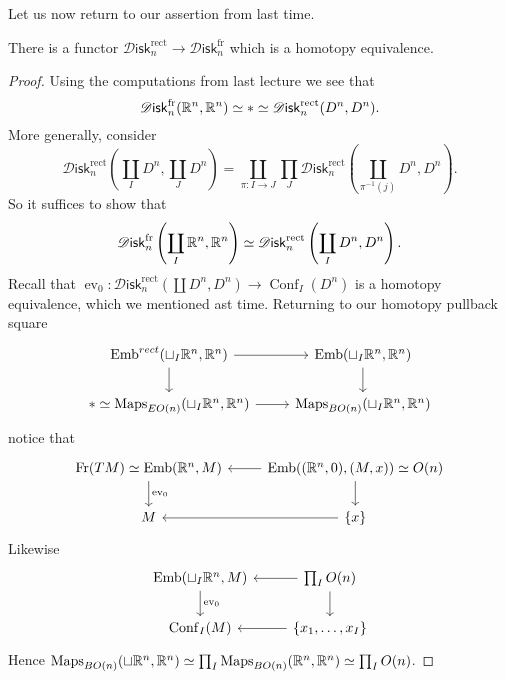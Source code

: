 \documentclass{amsart}
\DeclareMathOperator{\Emb}{Emb}
\DeclareMathOperator{\Conf}{Conf}
\DeclareMathOperator{\ev}{ev}
\newcommand{\Diskf}{\mathscr{D}\mathsf{isk}_n^\text{fr}}
\newcommand{\Diskr}{\mathscr{D}\mathsf{isk}_n^\text{rect}}
\begin{document}
Let us now return to our assertion from last time. 
\begin{proposition}
    There is a functor $\Diskr \to \Diskf$ which is a homotopy equivalence.
\end{proposition}
\begin{proof}
    Using the computations from last lecture we see that 
    \begin{equation*}
        \Diskf(\R^n, \R^n) \simeq * \simeq \Diskr(D^n, D^n).
    \end{equation*}
    More generally, consider
    \begin{equation*}
        \Diskr\left(\coprod_I D^n, \coprod_J D^n\right)=\coprod_{\pi:I\to J}\prod_J\Diskr\left(\coprod_{\pi^{-1}(j)}D^n,D^n\right).
    \end{equation*}
    So it suffices to show that
    \begin{equation*}
        \Diskf\left( \coprod_I\R^n,\R^n \right) \simeq \Diskr\left( \coprod_I D^n,D^n \right).
    \end{equation*}
    Recall that $\ev_0:\Diskr(\coprod D^n,D^n)\to \Conf_I(D^n)$ is a homotopy
    equivalence, which we mentioned ast time. Returning to our homotopy pullback square
    \begin{equation*}
        \begin{tikzcd}
            \Emb^{rect}(\sqcup_I \R^n, \R^n) \rar\dar & \Emb(\sqcup_I\R^n,\R^n)\dar \\
            *\simeq \Maps_{EO(n)}(\sqcup_I \R^n,\R^n) \rar & \Maps_{BO(n)}(\sqcup_I \R^n,\R^n)
        \end{tikzcd}
    \end{equation*}
    notice that
    \begin{equation*}
        \begin{tikzcd}
            \text{Fr}(TM)\simeq \Emb(\R^n, M)\dar{\ev_0} & \Emb( (\R^n,0), (M,x))\lar\dar \simeq O(n) \\
            M & \{x\}\lar
        \end{tikzcd}
    \end{equation*}
    Likewise
    \begin{equation*}
        \begin{tikzcd}
            \Emb(\sqcup_I \R^n, M)\dar{\ev_0} & \prod_I O(n)\lar \dar\\
            \Conf_I(M) & \{x_1,\ldots,x_I\}\lar
        \end{tikzcd}
    \end{equation*}
    Hence $\operatorname{Maps}_{BO(n)}(\sqcup\mathbb{R}^n,\mathbb{R}^n)\simeq \prod_I\operatorname{Maps}_{BO(n)}(\mathbb{R}^n,\mathbb{R}^n)\simeq\prod_IO(n)$.


\end{proof}
\end{document}
